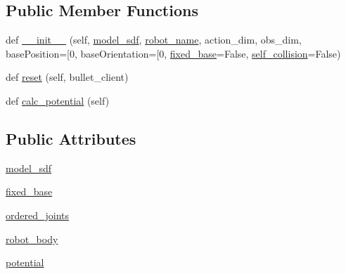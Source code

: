 \subsection*{Public Member Functions}
\begin{DoxyCompactItemize}
\item 
def \hyperlink{classpybullet-gym_1_1pybulletgym_1_1envs_1_1mujoco_1_1robots_1_1robot__bases_1_1_s_d_f_based_robot_aa09174ad35efd68cae101e8acd38730b}{\+\_\+\+\_\+init\+\_\+\+\_\+} (self, \hyperlink{classpybullet-gym_1_1pybulletgym_1_1envs_1_1mujoco_1_1robots_1_1robot__bases_1_1_s_d_f_based_robot_a1ebb4fdfaaabb52d9f2d6125f43d45e1}{model\+\_\+sdf}, \hyperlink{classpybullet-gym_1_1pybulletgym_1_1envs_1_1mujoco_1_1robots_1_1robot__bases_1_1_xml_based_robot_a5cbeb6a59e6f3507b1786ab2c99dad77}{robot\+\_\+name}, action\+\_\+dim, obs\+\_\+dim, base\+Position=\mbox{[}0, base\+Orientation=\mbox{[}0, \hyperlink{classpybullet-gym_1_1pybulletgym_1_1envs_1_1mujoco_1_1robots_1_1robot__bases_1_1_s_d_f_based_robot_a902ce434fb794c35e8aa59cea7589ea6}{fixed\+\_\+base}=False, \hyperlink{classpybullet-gym_1_1pybulletgym_1_1envs_1_1mujoco_1_1robots_1_1robot__bases_1_1_xml_based_robot_aecec207b8ac56d1e4c6035ab29c49969}{self\+\_\+collision}=False)
\item 
def \hyperlink{classpybullet-gym_1_1pybulletgym_1_1envs_1_1mujoco_1_1robots_1_1robot__bases_1_1_s_d_f_based_robot_acaa98f021435fbacb733df78cddd3c80}{reset} (self, bullet\+\_\+client)
\item 
def \hyperlink{classpybullet-gym_1_1pybulletgym_1_1envs_1_1mujoco_1_1robots_1_1robot__bases_1_1_s_d_f_based_robot_af3806235a98bfe1e1ed552137501e489}{calc\+\_\+potential} (self)
\end{DoxyCompactItemize}
\subsection*{Public Attributes}
\begin{DoxyCompactItemize}
\item 
\hyperlink{classpybullet-gym_1_1pybulletgym_1_1envs_1_1mujoco_1_1robots_1_1robot__bases_1_1_s_d_f_based_robot_a1ebb4fdfaaabb52d9f2d6125f43d45e1}{model\+\_\+sdf}
\item 
\hyperlink{classpybullet-gym_1_1pybulletgym_1_1envs_1_1mujoco_1_1robots_1_1robot__bases_1_1_s_d_f_based_robot_a902ce434fb794c35e8aa59cea7589ea6}{fixed\+\_\+base}
\item 
\hyperlink{classpybullet-gym_1_1pybulletgym_1_1envs_1_1mujoco_1_1robots_1_1robot__bases_1_1_s_d_f_based_robot_a1fc7945d23bc452fce1760101d6feb25}{ordered\+\_\+joints}
\item 
\hyperlink{classpybullet-gym_1_1pybulletgym_1_1envs_1_1mujoco_1_1robots_1_1robot__bases_1_1_s_d_f_based_robot_aa0dc7cb4e35ba7d98ec006916519959e}{robot\+\_\+body}
\item 
\hyperlink{classpybullet-gym_1_1pybulletgym_1_1envs_1_1mujoco_1_1robots_1_1robot__bases_1_1_s_d_f_based_robot_ac97db793615ab6847ec4318bd46ca5aa}{potential}
\end{DoxyCompactItemize}
